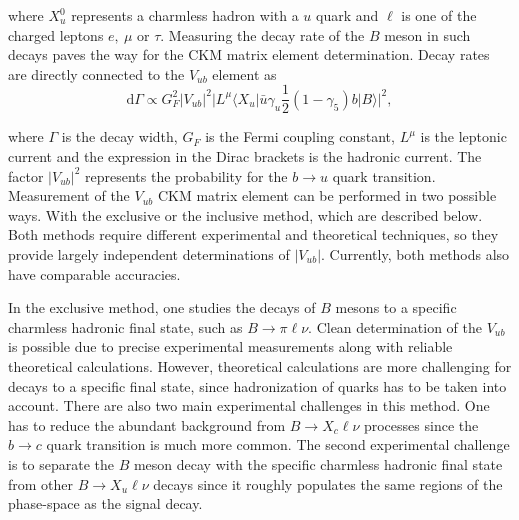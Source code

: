 where $X_u^0$ represents a charmless hadron with a $u$ quark and $\ell$ is one of the charged leptons $e,~\mu$ or $\tau$. Measuring the decay rate of the $B$ meson in such decays paves the way for the CKM matrix element determination. Decay rates are directly connected to the $V_{ub}$ element as
\begin{equation}
\mathrm{d} \Gamma \propto G_F^2 \vert V_{ub} \vert ^2 \vert L^\mu \langle X_u \vert \bar u \gamma_u \frac{1}{2} (1-\gamma_5) b \vert B \rangle \vert ^2,
\end{equation}

where $\Gamma$ is the decay width, $G_F$ is the Fermi coupling constant, $L^\mu$ is the leptonic current and the expression in the Dirac brackets is the hadronic current. The factor $\vert V_{ub} \vert ^2$ represents the probability for the $b \to u$ quark transition. Measurement of the $V_{ub}$ CKM matrix element can be performed in two possible ways. With the exclusive or the inclusive method, which are described below. Both methods require different experimental and theoretical techniques, so they provide largely independent determinations of $\vert V_{ub} \vert$. Currently, both methods also have comparable accuracies. 

In the exclusive method, one studies the decays of $B$ mesons to a specific charmless hadronic final state, such as $B \to \pi \ell \nu$. Clean determination of the $V_{ub}$ is possible due to precise experimental measurements along with reliable theoretical calculations. However, theoretical calculations are more challenging for decays to a specific final state, since hadronization of quarks has to be taken into account. There are also two main experimental challenges in this method. One has to reduce the abundant background from $B \to X_c \ell \nu$ processes since the $b \to c$ quark transition is much more common. The second experimental challenge is to separate the $B$ meson decay with the specific charmless hadronic final state from other $B \to X_u \ell \nu$ decays since it roughly populates the same regions of the phase-space as the signal decay.


